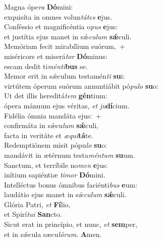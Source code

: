 \evenverse Magna ópe\textit{ra} \textbf{Dó}mini:~\*\\
\evenverse exquisíta in omnes volun\textit{tá}\textit{tes} \textbf{e}jus.\\
\oddverse Conféssio et magnificéntia o\textit{pus} \textbf{e}jus:~\*\\
\oddverse et justítia ejus manet in sǽ\textit{cu}\textit{lum} \textbf{sǽ}culi.\\
\evenverse Memóriam fecit mirabílium suórum,~+\\
\evenverse  miséricors et miserá\textit{tor} \textbf{Dó}minus:~\*\\
\evenverse escam dedit ti\textit{mén}\textit{ti}\textbf{bus} se.\\
\oddverse Memor erit in sǽculum testamén\textit{ti} \textbf{su}i:~\*\\
\oddverse virtútem óperum suórum annuntiábit pó\textit{pu}\textit{lo} \textbf{su}o:\\
\evenverse Ut det illis hereditá\textit{tem} \textbf{gén}tium:~\*\\
\evenverse ópera mánuum ejus véritas, \textit{et} \textit{ju}\textbf{dí}cium.\\
\oddverse Fidélia ómnia mandáta ejus:~+\\
\oddverse  confirmáta in sǽcu\textit{lum} \textbf{sǽ}culi,~\*\\
\oddverse facta in veritáte et \textit{æ}\textit{qui}\textbf{tá}te.\\
\evenverse Redemptiónem misit pópu\textit{lo} \textbf{su}o:~\*\\
\evenverse mandávit in ætérnum testa\textit{mén}\textit{tum} \textbf{su}um.\\
\oddverse Sanctum, et terríbile no\textit{men} \textbf{e}jus:~\*\\
\oddverse inítium sapiéntiæ \textit{ti}\textit{mor} \textbf{Dó}mini.\\
\evenverse Intelléctus bonus ómnibus faciénti\textit{bus} \textbf{e}um:~\*\\
\evenverse laudátio ejus manet in sǽ\textit{cu}\textit{lum} \textbf{sǽ}culi.\\
\oddverse Glória Patri, \textit{et} \textbf{Fí}lio,~\*\\
\oddverse et Spirí\textit{tu}\textit{i} \textbf{San}cto.\\
\evenverse Sicut erat in princípio, et nunc, \textit{et} \textbf{sem}per,~\*\\
\evenverse et in sǽcula sæcu\textit{ló}\textit{rum}. \textbf{A}men.\\
